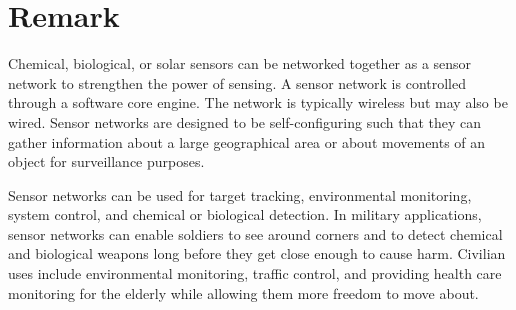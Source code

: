\section{Remark}

Chemical, biological, or solar sensors can be networked together as a sensor network to strengthen the power of sensing. A sensor network is controlled through a software core engine. The network is typically wireless but may also be wired. Sensor networks are designed to be self-configuring such that they can gather information about a large geographical area or about movements of an object for surveillance purposes.

Sensor networks can be used for target tracking, environmental monitoring, system control, and chemical or biological detection. In military applications, sensor networks can enable soldiers to see around corners and to detect chemical and biological weapons long before they get close enough to cause harm. Civilian uses include environmental monitoring, traffic control, and providing health care monitoring for the elderly while allowing them more freedom to move about.

